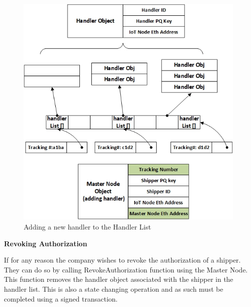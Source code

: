 \begin{figure}[h]
	\centering
    \includegraphics[width=120mm,scale=1]{figs/handler-impl}
	\caption{Adding a new handler to the Handler List}
	\label{fig:handler-impl} 
\end{figure}

\textbf{Revoking Authorization}

If for any reason the company wishes to revoke the authorization of a shipper. They can do so by calling RevokeAuthorization function using the Master Node. This function removes the handler object associated with the shipper in the handler list. This is also a state changing operation and as such must be completed using a signed transaction.


